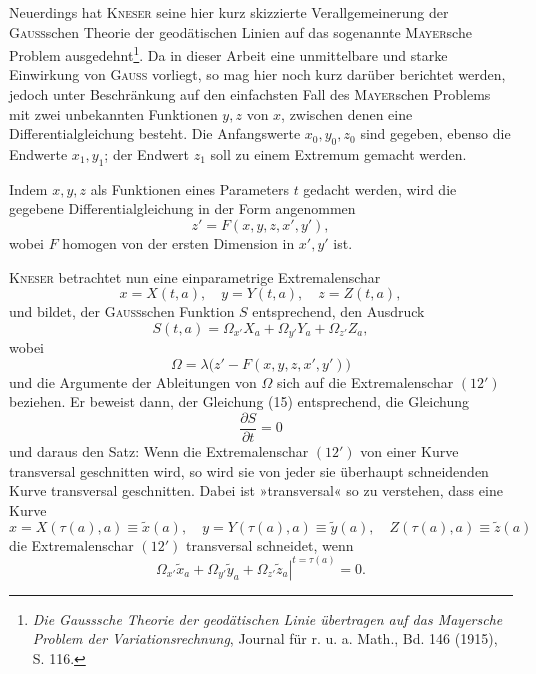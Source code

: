 Neuerdings hat \textsc{Kneser} seine hier kurz skizzierte Verallgemeinerung der
\textsc{Gauss}schen Theorie der geodätischen Linien auf das sogenannte \textsc{Mayer}sche
Problem ausgedehnt\begingroup\renewcommand{\thefootnote}{23a)}\footnote{\textit{Die Gausssche Theorie der geodätischen Linie übertragen auf das Mayersche Problem der
Variationsrechnung}, Journal für r. u. a. Math., Bd. 146 (1915), S. 116.}\endgroup. Da in dieser Arbeit eine unmittelbare und starke
Einwirkung von \textsc{Gauss} vorliegt, so mag hier noch kurz darüber berichtet
werden, jedoch unter Beschränkung auf den einfachsten Fall des \textsc{Mayer}schen
Problems mit zwei unbekannten Funktionen $y,z$ von $x$, zwischen denen eine
Differentialgleichung besteht. Die Anfangswerte $x_0,y_0,z_0$ sind gegeben, ebenso
die Endwerte $x_1,y_1$; der Endwert $z_1$ soll zu einem Extremum gemacht werden.

Indem $x,y,z$ als Funktionen eines Parameters $t$ gedacht werden, wird
die gegebene Differentialgleichung in der Form angenommen
\[
z'=F(x,y,z,x',y'),
\]
wobei $F$ homogen von der ersten Dimension in $x',y'$ ist.

\textsc{Kneser} betrachtet nun eine einparametrige Extremalenschar
\begin{equation*}\tag{$12'$}
x=X(t,a),\quad y=Y(t,a),\quad z=Z(t,a),
\end{equation*}
und bildet, der \textsc{Gauss}schen Funktion $S$ entsprechend, den Ausdruck
\begin{equation*}\tag{$14'$}
S(t,a)=\Omega_{x'}X_a+\Omega_{y'}Y_a+\Omega_{z'}Z_a,
\end{equation*}
wobei
\[
\Omega=\lambda\bigl(z'-F(x,y,z,x',y')\bigr)
\]
und die Argumente der Ableitungen von $\Omega$ sich auf die Extremalenschar $(12')$
beziehen. Er beweist dann, der Gleichung (15) entsprechend, die Gleichung
\begin{equation*}\tag{$15'$}
\frac{\partial S}{\partial t}=0
\end{equation*}
und daraus den Satz: Wenn die Extremalenschar $(12')$ von einer Kurve
\clearpage{}
\noindent transversal geschnitten wird, so wird sie von jeder sie überhaupt schneidenden
Kurve transversal geschnitten. Dabei ist »transversal« so zu verstehen, dass
eine Kurve
\[
x=X(\tau(a),a)\equiv\tilde x(a),\quad y=Y(\tau(a),a)\equiv\tilde y(a),\quad Z(\tau(a),a)\equiv\tilde z(a)
\]
die Extremalenschar $(12')$ transversal schneidet, wenn
\[
\left.\Omega_{x'}\tilde x_a+\Omega_{y'}\tilde y_a+\Omega_{z'}\tilde z_a\right|^{t=\tau(a)}=0.
\]

